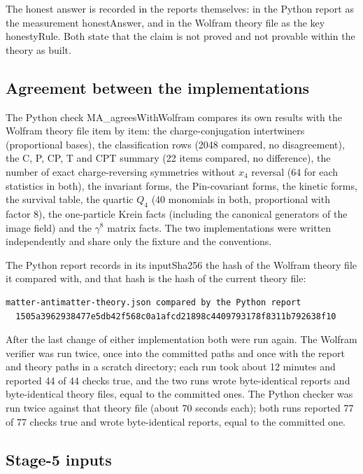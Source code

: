 \documentclass[11pt]{article}
\begin{document}
The honest answer is recorded in the reports themselves: in the Python report as the measurement honestAnswer, and in the Wolfram theory file as the key honestyRule. Both state that the claim is not proved and not provable within the theory as built.

\subsection{Agreement between the implementations}

The Python check MA\_agreesWithWolfram compares its own results with the Wolfram theory file item by item: the charge-conjugation intertwiners (proportional bases), the classification rows (2048 compared, no disagreement), the C, P, CP, T and CPT summary (22 items compared, no difference), the number of exact charge-reversing symmetries without $x_4$ reversal (64 for each statistics in both), the invariant forms, the Pin-covariant forms, the kinetic forms, the survival table, the quartic $Q_4$ (40 monomials in both, proportional with factor 8), the one-particle Krein facts (including the canonical generators of the image field) and the $\gamma^8$ matrix facts. The two implementations were written independently and share only the fixture and the conventions.

The Python report records in its inputSha256 the hash of the Wolfram theory file it compared with, and that hash is the hash of the current theory file:

\begin{Verbatim}[fontsize=\small]
matter-antimatter-theory.json compared by the Python report
  1505a3962938477e5db42f568c0a1afcd21898c4409793178f8311b792638f10
\end{Verbatim}

After the last change of either implementation both were run again. The Wolfram verifier was run twice, once into the committed paths and once with the report and theory paths in a scratch directory; each run took about 12 minutes and reported 44 of 44 checks true, and the two runs wrote byte-identical reports and byte-identical theory files, equal to the committed ones. The Python checker was run twice against that theory file (about 70 seconds each); both runs reported 77 of 77 checks true and wrote byte-identical reports, equal to the committed one.

\subsection{Stage-5 inputs}
\end{document}
